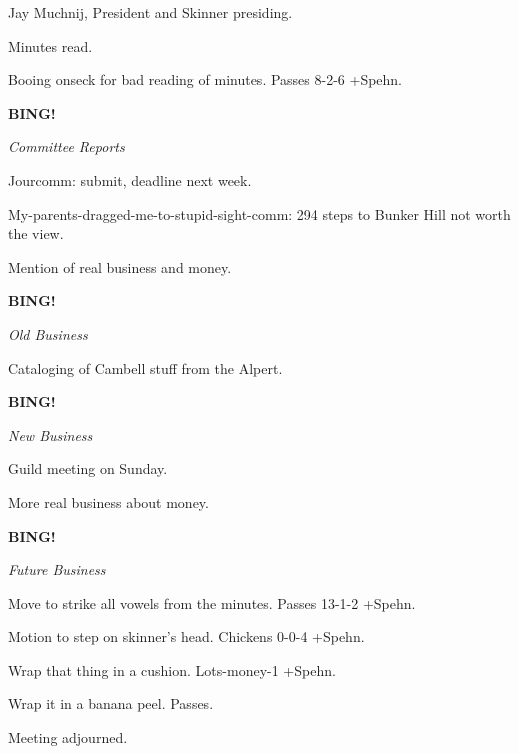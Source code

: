 \documentclass[12pt]{article}
\newcommand{\bing}{{\bf BING!} }
\newcommand{\goto}[1]{\bing \vskip 12pt \centerline{{\em{#1}}}}
\begin{document}
\vspace{18pt}

\setlength{\parskip}{6pt}

\noindent
Jay Muchnij, President and Skinner presiding.

Minutes read.

Booing onseck for bad reading of minutes. Passes 8-2-6 +Spehn.

\goto{Committee Reports}

Jourcomm: submit, deadline next week.

My-parents-dragged-me-to-stupid-sight-comm: 294 steps to Bunker Hill not worth the view.

Mention of real business and money.

\goto{Old Business}

Cataloging of Cambell stuff from the Alpert.

\goto{New Business}

Guild meeting on Sunday.

More real business about money.

\goto{Future Business}

Move to strike all vowels from the minutes. Passes 13-1-2 +Spehn.

Motion to step on skinner's head. Chickens 0-0-4 +Spehn.

Wrap that thing in a cushion. Lots-money-1 +Spehn.

Wrap it in a banana peel. Passes.

\vspace{12pt}

\noindent

Meeting adjourned.
\end{document}
